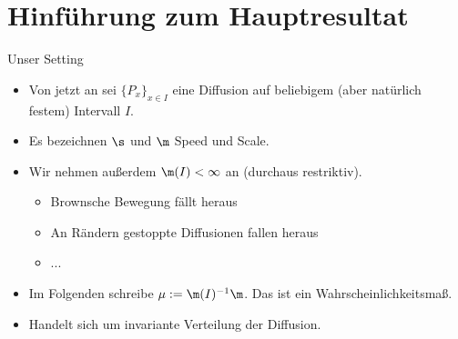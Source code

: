 \section{Hinführung zum Hauptresultat}
\begin{frame}{Unser Setting}
\begin{itemize}
    \item Von jetzt an sei $\{P_x\}_{x \in I}$ eine Diffusion auf beliebigem (aber natürlich festem) Intervall $I$.
    \item Es bezeichnen $\s$ und $\m$ Speed und Scale.
    \pause
    \item Wir nehmen außerdem $\m(I) < \infty$ an (durchaus restriktiv).
    \begin{itemize}
        \item Brownsche Bewegung fällt heraus
        \item An Rändern gestoppte Diffusionen fallen heraus
        \item ...
    \end{itemize}
    \pause
    \item Im Folgenden schreibe $\mu := \m(I)^{-1}\m$. Das ist ein Wahrscheinlichkeitsmaß.
    \item Handelt sich um invariante Verteilung der Diffusion.
\end{itemize}
\end{frame}


